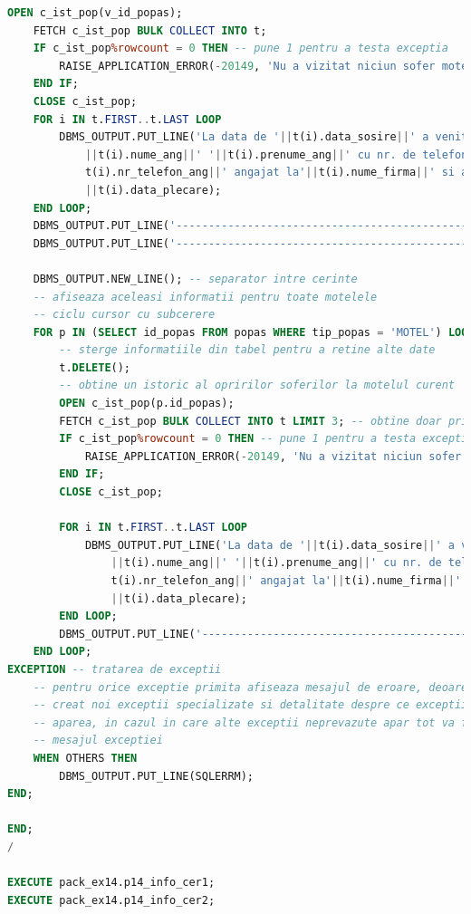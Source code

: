 \documentclass[12pt, a4paper]{article}
\begin{document}
\begin{lstlisting}[language=SQL]
    OPEN c_ist_pop(v_id_popas);
    FETCH c_ist_pop BULK COLLECT INTO t;
    IF c_ist_pop%rowcount = 0 THEN -- pune 1 pentru a testa exceptia
        RAISE_APPLICATION_ERROR(-20149, 'Nu a vizitat niciun sofer motelul cu id-ul '||v_id_popas);
    END IF;
    CLOSE c_ist_pop;
    FOR i IN t.FIRST..t.LAST LOOP
        DBMS_OUTPUT.PUT_LINE('La data de '||t(i).data_sosire||' a venit soferul '
            ||t(i).nume_ang||' '||t(i).prenume_ang||' cu nr. de telefon '||
            t(i).nr_telefon_ang||' angajat la'||t(i).nume_firma||' si a plecat la '
            ||t(i).data_plecare);
    END LOOP;
    DBMS_OUTPUT.PUT_LINE('-----------------------------------------------'); 
    DBMS_OUTPUT.PUT_LINE('-----------------------------------------------'); 

    DBMS_OUTPUT.NEW_LINE(); -- separator intre cerinte
    -- afiseaza aceleasi informatii pentru toate motelele
    -- ciclu cursor cu subcerere
    FOR p IN (SELECT id_popas FROM popas WHERE tip_popas = 'MOTEL') LOOP
        -- sterge informatiile din tabel pentru a retine alte date
        t.DELETE();    
        -- obtine un istoric al opririlor soferilor la motelul curent
        OPEN c_ist_pop(p.id_popas);
        FETCH c_ist_pop BULK COLLECT INTO t LIMIT 3; -- obtine doar primele 3
        IF c_ist_pop%rowcount = 0 THEN -- pune 1 pentru a testa exceptia
            RAISE_APPLICATION_ERROR(-20149, 'Nu a vizitat niciun sofer motelul cu id-ul '||p.id_popas);
        END IF;
        CLOSE c_ist_pop;
        
        FOR i IN t.FIRST..t.LAST LOOP
            DBMS_OUTPUT.PUT_LINE('La data de '||t(i).data_sosire||' a venit soferul '
                ||t(i).nume_ang||' '||t(i).prenume_ang||' cu nr. de telefon '||
                t(i).nr_telefon_ang||' angajat la'||t(i).nume_firma||' si a plecat la '
                ||t(i).data_plecare);
        END LOOP;
        DBMS_OUTPUT.PUT_LINE('-----------------------------------------------');     
    END LOOP; 
EXCEPTION -- tratarea de exceptii
    -- pentru orice exceptie primita afiseaza mesajul de eroare, deoarece am
    -- creat noi exceptii specializate si detalitate despre ce exceptii ar putea
    -- aparea, in cazul in care alte exceptii neprevazute apar tot va fi afisat
    -- mesajul exceptiei
    WHEN OTHERS THEN
        DBMS_OUTPUT.PUT_LINE(SQLERRM);
END;

END;
/

EXECUTE pack_ex14.p14_info_cer1;
EXECUTE pack_ex14.p14_info_cer2;
\end{lstlisting}
\end{document}
